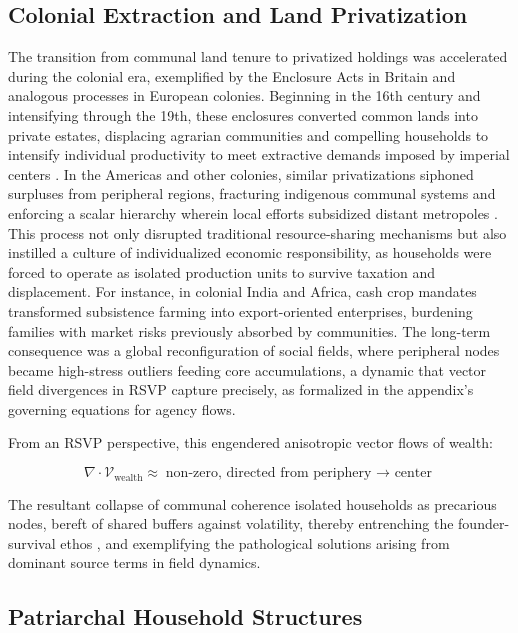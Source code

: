 \documentclass[11pt]{article}
\begin{document}
\subsection{Colonial Extraction and Land Privatization}

The transition from communal land tenure to privatized holdings was accelerated during the colonial era, exemplified by the Enclosure Acts in Britain and analogous processes in European colonies. Beginning in the 16th century and intensifying through the 19th, these enclosures converted common lands into private estates, displacing agrarian communities and compelling households to intensify individual productivity to meet extractive demands imposed by imperial centers \citep{linebaugh2008magna}. In the Americas and other colonies, similar privatizations siphoned surpluses from peripheral regions, fracturing indigenous communal systems and enforcing a scalar hierarchy wherein local efforts subsidized distant metropoles \citep{mann2005_1491, pomeranz2000great}. This process not only disrupted traditional resource-sharing mechanisms but also instilled a culture of individualized economic responsibility, as households were forced to operate as isolated production units to survive taxation and displacement. For instance, in colonial India and Africa, cash crop mandates transformed subsistence farming into export-oriented enterprises, burdening families with market risks previously absorbed by communities. The long-term consequence was a global reconfiguration of social fields, where peripheral nodes became high-stress outliers feeding core accumulations, a dynamic that vector field divergences in RSVP capture precisely, as formalized in the appendix's governing equations for agency flows.

From an RSVP perspective, this engendered anisotropic vector flows of wealth:

\begin{equation}
\nabla \cdot \mathcal{V}_{\text{wealth}} \approx \text{non-zero, directed from periphery $\rightarrow$ center}
\end{equation}

The resultant collapse of communal coherence isolated households as precarious nodes, bereft of shared buffers against volatility, thereby entrenching the founder-survival ethos \citep{scott1998seeing}, and exemplifying the pathological solutions arising from dominant source terms in field dynamics.

\subsection{Patriarchal Household Structures}
\end{document}
